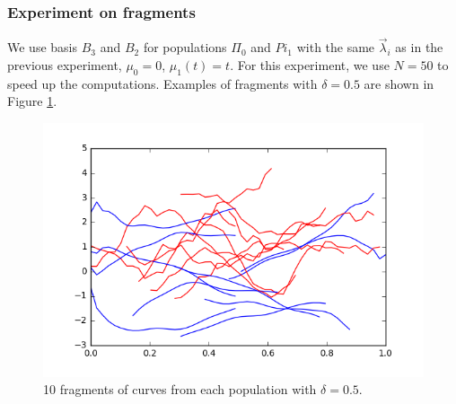 \documentclass[10pt, a4paper]{article}
\theoremstyle{remark}
\begin{document}
\subsubsection*{Experiment on fragments}
We use basis $B_3$ and $B_2$ for populations $\Pi_0$ and $Pi_1$ with the same $\vec{\lambda}_i$ as in the previous experiment, $\mu_0 = 0$, $\mu_1(t)=t$. For this experiment, we use $N=50$ to speed up the computations. Examples of fragments with $\delta = 0.5$ are shown in Figure \ref{fig:fragex}.
\begin{figure}
\centering
\includegraphics[width=0.7\linewidth]{Code/report_images/fragex}
\caption{10 fragments of curves from each population with $\delta=0.5$.}
\label{fig:fragex}
\end{figure}
\end{document}
